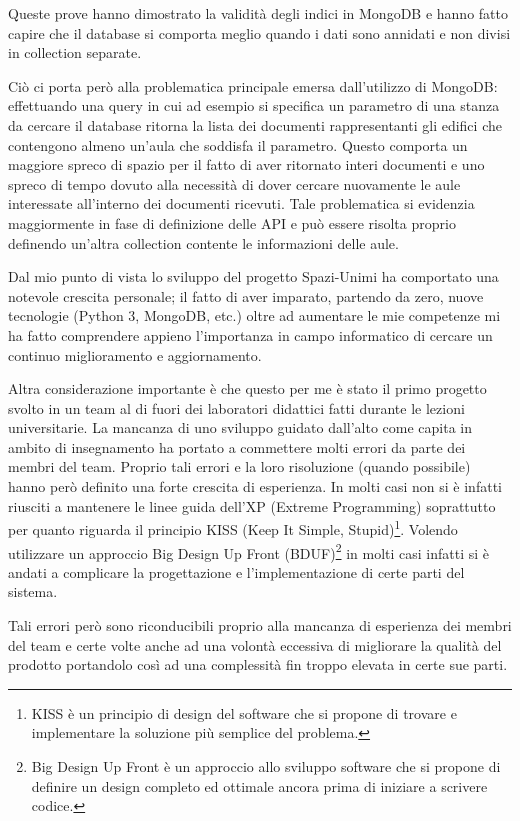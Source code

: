 \documentclass[12pt]{report}
\begin{document}
Queste prove hanno dimostrato la validità degli indici in MongoDB e hanno fatto capire che il database si comporta meglio quando i dati sono annidati e non divisi in collection separate.

Ciò ci porta però alla problematica principale emersa dall'utilizzo di MongoDB: effettuando una query in cui ad esempio si specifica un parametro di una stanza da cercare il database ritorna la lista dei documenti rappresentanti gli edifici che contengono almeno un'aula che soddisfa il parametro.
Questo comporta un maggiore spreco di spazio per il fatto di aver ritornato interi documenti e uno spreco di tempo dovuto alla necessità di dover cercare nuovamente le aule interessate all'interno dei documenti ricevuti.
Tale problematica si evidenzia maggiormente in fase di definizione delle API e può essere risolta proprio definendo un'altra collection contente le informazioni delle aule.  

\vspace{5mm} %

Dal mio punto di vista lo sviluppo del progetto Spazi-Unimi ha comportato una notevole crescita personale; il fatto di aver imparato, partendo da zero, nuove tecnologie (Python 3, MongoDB, etc.) oltre ad aumentare le mie competenze mi ha fatto comprendere appieno l'importanza in campo informatico di cercare un continuo miglioramento e aggiornamento.

Altra considerazione importante è che questo per me è stato il primo progetto svolto in un team al di fuori dei laboratori didattici fatti durante le lezioni universitarie.
La mancanza di uno sviluppo guidato dall'alto come capita in ambito di insegnamento ha portato a commettere molti errori da parte dei membri del team.
Proprio tali errori e la loro risoluzione (quando possibile) hanno però definito una forte crescita di esperienza.
In molti casi non si è infatti riusciti a mantenere le linee guida dell'XP (Extreme Programming) soprattutto per quanto riguarda il principio KISS (Keep It Simple, Stupid)\footnote{KISS è un principio di design del software che si propone di trovare e implementare la soluzione più semplice del problema.}.
Volendo utilizzare un approccio Big Design Up Front (BDUF)\footnote{Big Design Up Front è un approccio allo sviluppo software che si propone di definire un design completo ed ottimale ancora prima di iniziare a scrivere codice.} in molti casi infatti si è andati a complicare la progettazione e l'implementazione di certe parti del sistema.

Tali errori però sono riconducibili proprio alla mancanza di esperienza dei membri del team e certe volte anche ad una volontà eccessiva di migliorare la qualità del prodotto portandolo così ad una complessità fin troppo elevata in certe sue parti.
\end{document}
